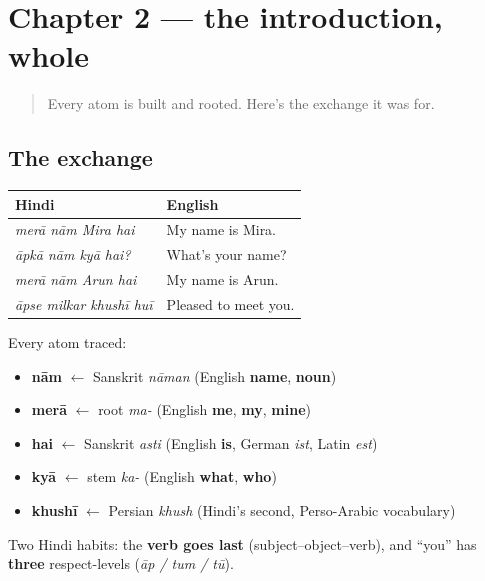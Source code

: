 \section[Practice]{Chapter 2 — the introduction, whole}

\label{lesson:HI-C02-practice}



\begin{quote}
Every atom is built and rooted. Here's the exchange it was for.
\end{quote}

\subsection*{The exchange}
\noindent
\begin{tabularx}{\linewidth}{@{}>{\raggedright\arraybackslash}X>{\raggedright\arraybackslash}X@{}}
\toprule
\textbf{Hindi} & \textbf{English} \\
\midrule
\emph{merā nām Mira hai} & My name is Mira. \\
\emph{āpkā nām kyā hai?} & What's your name? \\
\emph{merā nām Arun hai} & My name is Arun. \\
\emph{āpse milkar khushī huī} & Pleased to meet you. \\
\bottomrule
\end{tabularx}

Every atom traced:

\begin{itemize}
\raggedright
  \item \textbf{nām} $\leftarrow$ Sanskrit \emph{nāman} (English \textbf{name}, \textbf{noun})
  \item \textbf{merā} $\leftarrow$ root \emph{ma-} (English \textbf{me}, \textbf{my}, \textbf{mine})
  \item \textbf{hai} $\leftarrow$ Sanskrit \emph{asti} (English \textbf{is}, German \emph{ist}, Latin \emph{est})
  \item \textbf{kyā} $\leftarrow$ stem \emph{ka-} (English \textbf{what}, \textbf{who})
  \item \textbf{khushī} $\leftarrow$ Persian \emph{khush} (Hindi's second, Perso-Arabic vocabulary)
\end{itemize}

Two Hindi habits: the \textbf{verb goes last} (subject–object–verb), and \textquotedblleft{}you\textquotedblright{} has \textbf{three} respect-levels (\emph{āp / tum / tū}).

